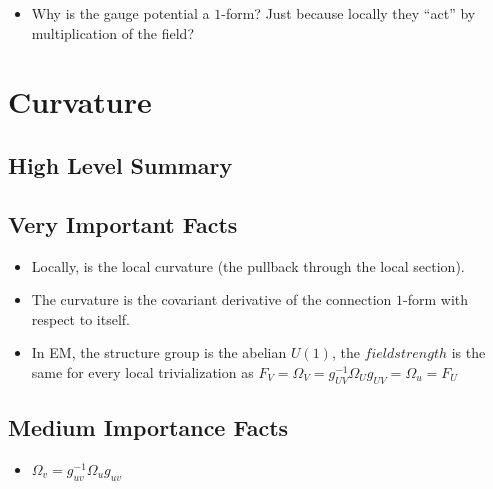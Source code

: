 \documentclass[12pt]{report}
\begin{document}
\begin{itemize}
    \item Why is the gauge potential a $1$-form? Just because locally they ``act'' by multiplication of the field?
\end{itemize}

\chapter{Curvature}
\section{High Level Summary}

\section{Very Important Facts}

\begin{itemize}
    \item Locally,  is the local curvature (the pullback through the local section).
    
    \item The curvature is the covariant derivative of the connection $1$-form with respect to itself.
    
    \item In EM, the structure group is the abelian $U(1)$, the $field strength$ is the same for every local trivialization as $F_V = \Omega_V = g^{-1}_{UV}\Omega_U g_{UV} = \Omega_u = F_U$ 
\end{itemize}

\section{Medium Importance Facts}
\begin{itemize}
    \item $\Omega_v = g_{uv}^{-1} \Omega_u g_{uv}$
\end{itemize}
\end{document}

